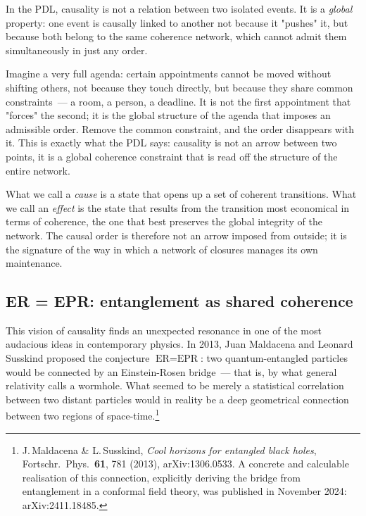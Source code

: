 \documentclass[12pt, a4paper, openright]{book}
\begin{document}
In the PDL, causality is not a relation between two isolated events. It is a \emph{global} property: one event is causally linked to another not because it "pushes" it, but because both belong to the same coherence network, which cannot admit them simultaneously in just any order.

\medskip

Imagine a very full agenda: certain appointments cannot be moved without shifting others, not because they touch directly, but because they share common constraints~--- a room, a person, a deadline. It is not the first appointment that "forces" the second; it is the global structure of the agenda that imposes an admissible order. Remove the common constraint, and the order disappears with it. This is exactly what the PDL says: causality is not an arrow between two points, it is a global coherence constraint that is read off the structure of the entire network.

\medskip

What we call a \emph{cause} is a state that opens up a set of coherent transitions. What we call an \emph{effect} is the state that results from the transition most economical in terms of coherence, the one that best preserves the global integrity of the network. The causal order is therefore not an arrow imposed from outside; it is the signature of the way in which a network of closures manages its own maintenance.

\subsection*{ER = EPR: entanglement as shared coherence}

This vision of causality finds an unexpected resonance in one of the most audacious ideas in contemporary physics. In 2013, Juan Maldacena and Leonard Susskind proposed the conjecture $\text{ER} = \text{EPR}$: two quantum-entangled particles would be connected by an Einstein-Rosen bridge~--- that is, by what general relativity calls a wormhole. What seemed to be merely a statistical correlation between two distant particles would in reality be a deep geometrical connection between two regions of space-time.\footnote{J.\,Maldacena \& L.\,Susskind, \textit{Cool horizons for entangled black holes}, Fortschr.\ Phys.\ \textbf{61}, 781 (2013), arXiv:1306.0533. A concrete and calculable realisation of this connection, explicitly deriving the bridge from entanglement in a conformal field theory, was published in November 2024: arXiv:2411.18485.}
\end{document}
